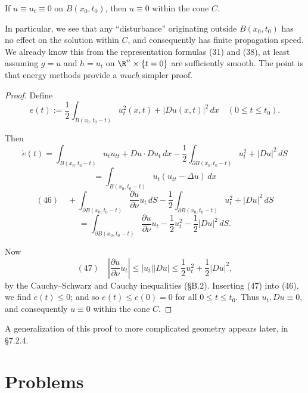 \begin{figure}[h]\centering
\end{figure}

\begin{theorem}
\label{thm:wave-equation-finite-propagation-speed}
If $u \equiv u_t \equiv 0$ on $B(x_0,t_0)$, then $u \equiv 0$ within the cone $C$.
\end{theorem}

In particular, we see that any ``disturbance'' originating outside $B(x_0,t_0)$ has no effect on the solution within $C$, and consequently has finite propagation speed. We already know this from the representation formulas (31) and (38), at least assuming $g = u$ and $h = u_t$ on $\R^n \times \{t=0\}$ are sufficiently smooth. The point is that energy methods provide a \textit{much} simpler proof.

\begin{proof}
Define
$$e(t) := \frac12 \int_{B(x_0,t_0-t)} u_t^2(x,t) + |Du(x,t)|^2\,dx \quad (0 \leq t \leq t_0).$$

Then
$$\dot{e}(t) = \int_{B(x_0,t_0-t)} u_t u_{tt} + Du \cdot Du_t \, dx - \frac{1}{2}\int_{\partial B(x_0,t_0-t)} u_t^2 + |Du|^2 \, dS$$
$$= \int_{B(x_0,t_0-t)} u_t(u_{tt} - \Delta u) \, dx$$
$$(46) \quad + \int_{\partial B(x_0,t_0-t)} \frac{\partial u}{\partial \nu} u_t \, dS - \frac{1}{2}\int_{\partial B(x_0,t_0-t)} u_t^2 + |Du|^2 \, dS$$
$$= \int_{\partial B(x_0,t_0-t)} \frac{\partial u}{\partial \nu} u_t - \frac{1}{2}u_t^2 - \frac{1}{2}|Du|^2 \, dS.$$

Now
$$(47) \quad \left|\frac{\partial u}{\partial \nu} u_t\right| \leq |u_t||Du| \leq \frac{1}{2}u_t^2 + \frac{1}{2}|Du|^2,$$
by the Cauchy--Schwarz and Cauchy inequalities (\S B.2). Inserting (47) into (46), we find $\dot{e}(t) \leq 0$; and so $e(t) \leq e(0) = 0$ for all $0 \leq t \leq t_0$. Thus $u_t, Du \equiv 0$, and consequently $u \equiv 0$ within the cone $C$.
\end{proof}

A generalization of this proof to more complicated geometry appears later, in \S7.2.4.

\section{Problems}
\label{sec:chapter2-problems}

